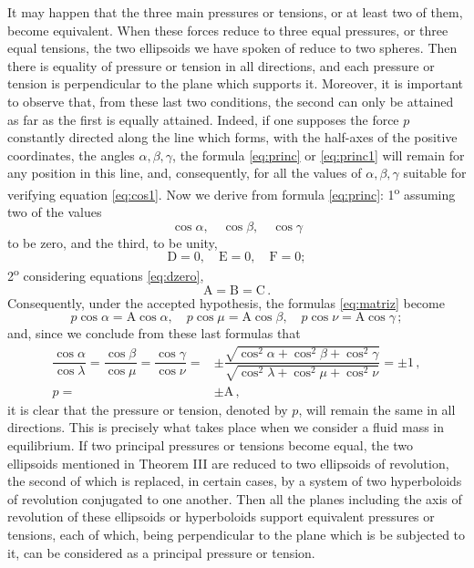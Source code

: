\documentclass[leqno,openright,smallroyalvopaper,8pt,twoside,showtrims]{memoir}
\begin{document}
It may happen that the three main pressures or tensions, or at least two of them, become equivalent. When these forces reduce to three equal pressures, or three equal tensions, the two ellipsoids we have spoken of reduce to two spheres. Then there is equality of pressure or tension in all directions, and each pressure or tension is perpendicular to the plane which supports it. Moreover, it is important to observe that, from these last two conditions, the second can only be attained as far as the first is equally attained. Indeed, if one supposes the force $p$ constantly directed along the line which forms, with the half-axes of the positive coordinates, the angles $\alpha,\beta,\gamma$, the formula \eqref{eq:princ} or \eqref{eq:princ1} will remain for any position in this line, and, consequently, for all the values of $\alpha,\beta,\gamma$ suitable for verifying equation \eqref{eq:cos1}. Now we derive from formula \eqref{eq:princ}: 1\textsuperscript{o} assuming two of the values
\begin{equation*}
\cos\alpha,\quad \cos\beta,\quad \cos\gamma
\end{equation*}
to be zero, and the third, to be unity, 
\begin{equation}\label{eq:dzero}
\text{D}=0,\quad \text{E}=0,\quad \text{F}=0;
\end{equation}
2\textsuperscript{o} considering equations \eqref{eq:dzero},
\begin{equation}
\text{A}=\text{B}=\text{C}\,.
\end{equation}
Consequently, under the accepted hypothesis, the formulas \eqref{eq:matriz} become
\begin{equation}
p\cos\alpha=\text{A}\cos\alpha,\quad p\cos\mu=\text{A}\cos\beta,\quad p\cos\nu=\text{A}\cos\gamma\,;
\end{equation}
and, since we conclude from these last formulas that
\begin{align}
\dfrac{\cos\alpha}{\cos\lambda}=\dfrac{\cos\beta}{\cos\mu}=\dfrac{\cos\gamma}{\cos\nu}=&\pm\dfrac{\sqrt{\cos^2\alpha+\cos^2\beta+\cos^2\gamma}}{\sqrt{\cos^2\lambda+\cos^2\mu+\cos^2\nu}}=\pm 1\,,\\
p=&\pm \text{A}\,,
\end{align}
it is clear that the pressure or tension, denoted by $p$, will remain the same in all directions. This is precisely what takes place when we consider a fluid mass in equilibrium. If two principal pressures or tensions become equal, the two ellipsoids mentioned in Theorem III are reduced to two ellipsoids of revolution, the second of which is replaced, in certain cases, by a system of two hyperboloids of revolution conjugated to one another. Then all the planes including the axis of revolution of these ellipsoids or hyperboloids support equivalent pressures or tensions, each of which, being perpendicular to the plane which is be subjected to it, can be considered as a principal pressure or tension.
\end{document}
